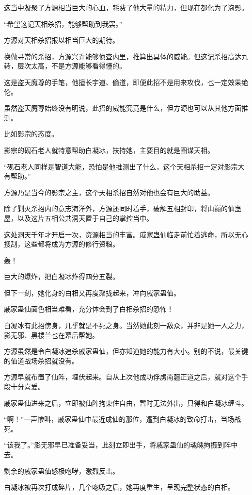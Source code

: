 \begin{this_body}
这当中凝聚了方源相当巨大的心血，耗费了他大量的精力，但现在都化为了泡影。

“希望这记天相杀招，能够帮助到我罢。”

方源对天相杀招报以相当巨大的期待。

换做寻常的杀招，方源兴许能够侦查内里，推算出具体的威能。但这记杀招高达九转，层次太高，不是方源能够看得懂的。

这是盗天魔尊的手笔，他擅长宇道、偷道，即便此招不是用来攻伐，也一定效果绝伦。

虽然盗天魔尊始终没有明说，此招的威能究竟是什么，但方源也可以从其他方面推测。

比如影宗的态度。

影宗的砚石老人就特意帮助白凝冰，扶持她，主要目的就是图谋天相。

“砚石老人同样是智道大能，恐怕是他推测出了什么，这个天相杀招一定对影宗大有帮助。”

方源乃是当今的影宗之主，这个天相杀招自然对他也会有巨大的助益。

除了剿灭杀招内的意志海洋外，方源还同时着手，破解五相封印，将山巅的仙蛊屋，以及这片五相公共洞天置于自己的掌控当中。

这处洞天千年才开启一次，资源相当的丰富。戚家蛊仙临走前忙着逃命，所以无心搜刮，这些都将成为方源的修行资粮。

轰！

巨大的爆炸，把白凝冰炸得四分五裂。

但下一刻，她化身的白相又再度聚拢起来，冲向戚家蛊仙。

戚家蛊仙面色相当难看，充分体会到了白相杀招的恐怖！

白凝冰有此招傍身，几乎就是不死之身。当然她此刻一敌众，并非是她一人之力，影无邪、黑楼兰也在幕后帮她。

方源虽然是令白凝冰追杀戚家蛊仙，但亦知道她的能力有大小。别的不说，最关键的仙道战场杀招就没有。

方源早就布置了仙阵，埋伏起来。自从上次他成功俘虏南疆正道之后，就对这个手段十分喜爱。

戚家蛊仙进来之后，立即被仙阵拘束住自由，暂时无法外出，只得和白凝冰缠斗。

“啊！”一声惨叫，戚家蛊仙中最近成仙的那位，遭到白凝冰的致命打击，当场战死。

“该我了。”影无邪早已准备妥当，此刻立即出手，将戚家蛊仙的魂魄拘摄到阵中去。

剩余的戚家蛊仙怒极咆哮，激烈反击。

白凝冰被再次打成碎片，几个唿吸之后，她再度重生，呈现完整状态的白相。


\end{this_body}
